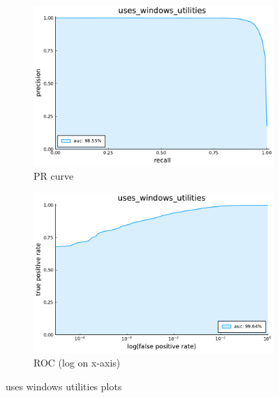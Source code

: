 \begin{figure}
    \centering
    \begin{subfigure}{.49\textwidth}
      \centering
      \includegraphics[width=1\linewidth]{pdfs/modperf/uses_windows_utilities.bson-pr.pdf}
      \caption{PR curve}
    \end{subfigure}
    \begin{subfigure}{.49\textwidth}
        \centering
        \includegraphics[width=1\linewidth]{pdfs/modperf/uses_windows_utilities.bson-roclog.pdf}
        \caption{ROC (log on x-axis)}
    \end{subfigure}
    \caption{uses windows utilities plots}
    \label{fig:fig}
\end{figure}

